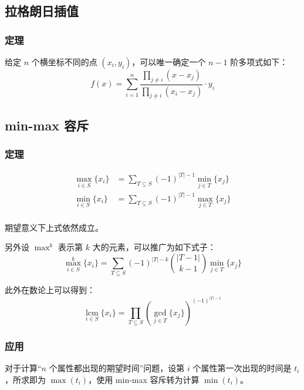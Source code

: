 \documentclass[10pt]{ctexart}
\begin{document}
\begin{multicols}{3}
    \subsection{拉格朗日插值}\label{ux62c9ux683cux6717ux65e5ux63d2ux503c}

    \subsubsection{定理}\label{ux5b9aux7406-1}

    给定 \(n\) 个横坐标不同的点 \((x_i, y_i)\)，可以唯一确定一个
    \(n - 1\) 阶多项式如下：\[
    f(x) = \sum_{i=1}^n \frac{\prod_{j\neq i} (x-x_j)}{\prod_{j\neq i}(x_i-x_j)} \cdot y_i
    \]

    \subsection{min-max 容斥}\label{min-max-ux5bb9ux65a5}

    \subsubsection{定理}\label{ux5b9aux7406-2}

    \[\begin{aligned}
    \max_{i\in S} \{x_i\} &= \sum_{T\subseteq S}(-1)^{|T| - 1}\min_{j\in T}\{x_j\} \\
    \min_{i\in S} \{x_i\} &= \sum_{T\subseteq S}(-1)^{|T| - 1}\max_{j\in T}\{x_j\} \\
    \end{aligned}\]

    期望意义下上式依然成立。

    另外设 \(\max^k\) 表示第 \(k\) 大的元素，可以推广为如下式子：\[
    \max_{i\in S}^k \{x_i\} = \sum_{T\subseteq S}(-1)^{|T| - k}\binom{|T - 1|}{k - 1} \min_{j\in T}\{x_j\}
    \]

    此外在数论上可以得到：\[
    \operatorname*{lcm}_{i\in S} \{x_i\} = \prod_{T\subseteq S} \left(\gcd_{j\in T}\{x_j\}\right)^{(-1)^{|T| - 1}}
    \]

    \subsubsection{应用}\label{ux5e94ux7528}

    对于计算``\(n\) 个属性都出现的期望时间''问题，设第 \(i\)
    个属性第一次出现的时间是 \(t_i\)，所求即为 \(\max(t_i)\)，使用
    min-max 容斥转为计算 \(\min(t_i)\)。


\end{multicols}
\end{document}
